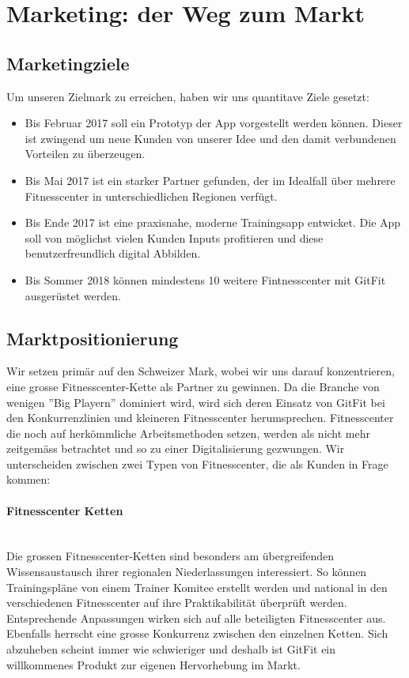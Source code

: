 \section{Marketing: der Weg zum Markt}\label{sec:marketing-der-weg-zum-markt}

\subsection{Marketingziele}
Um unseren Zielmark zu erreichen, haben wir uns quantitave Ziele gesetzt:
\begin{itemize}
	\item Bis Februar 2017 soll ein Prototyp der App vorgestellt werden können. Dieser ist zwingend um neue Kunden von unserer Idee und den damit verbundenen Vorteilen zu überzeugen.
	\item Bis Mai 2017 ist ein starker Partner gefunden, der im Idealfall über mehrere Fitnesscenter in unterschiedlichen Regionen verfügt.
	\item Bis Ende 2017 ist eine praxisnahe, moderne Trainingsapp entwicket. Die App soll von möglichst vielen Kunden Inputs profitieren und diese benutzerfreundlich digital Abbilden.
	\item Bis Sommer 2018 können mindestens 10 weitere Fintnesscenter mit GitFit ausgerüstet werden.
\end{itemize}

\subsection{Marktpositionierung}
Wir setzen primär auf den Schweizer Mark, wobei wir uns darauf konzentrieren, eine grosse Fitnesscenter-Kette als Partner zu gewinnen. Da die Branche von wenigen ''Big Playern'' dominiert wird,  wird sich deren Einsatz von GitFit bei den Konkurrenzlinien und kleineren Fitnesscenter herumsprechen. Fitnesscenter die noch auf herkömmliche Arbeitsmethoden setzen, werden als nicht mehr zeitgemäss betrachtet und so zu einer Digitalisierung gezwungen. Wir unterscheiden zwischen zwei Typen von Fitnesscenter, die als Kunden in Frage kommen:

\paragraph{Fitnesscenter Ketten} \hfill \\
Die grossen Fitnesscenter-Ketten sind besonders am übergreifenden Wissensaustausch ihrer regionalen Niederlassungen interessiert. So können Trainingspläne von einem Trainer Komitee erstellt werden und national in den verschiedenen Fitnesscenter auf ihre Praktikabilität überprüft werden. Entsprechende Anpassungen wirken sich auf alle beteiligten Fitnesscenter aus. Ebenfalls herrscht eine grosse Konkurrenz zwischen den einzelnen Ketten. Sich abzuheben scheint immer wie schwieriger und deshalb ist GitFit ein willkommenes Produkt zur eigenen Hervorhebung im Markt. 

